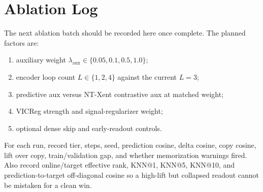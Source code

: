 \section{Ablation Log}
\label{app:ablation_log}

The next ablation batch should be recorded here once complete.  The
planned factors are:
\begin{enumerate}
    \item auxiliary weight $\lambda_{\mathrm{aux}} \in \{0.05, 0.1, 0.5, 1.0\}$;
    \item encoder loop count $L \in \{1,2,4\}$ against the current $L=3$;
    \item predictive aux versus NT-Xent contrastive aux at matched weight;
    \item VICReg strength and signal-regularizer weight;
    \item optional dense skip and early-readout controls.
\end{enumerate}

For each run, record tier, steps, seed, prediction cosine, delta cosine,
copy cosine, lift over copy, train/validation gap, and whether
memorization warnings fired.  Also record online/target effective rank,
KNN@1, KNN@5, KNN@10, and prediction-to-target off-diagonal cosine so a
high-lift but collapsed readout cannot be mistaken for a clean win.
